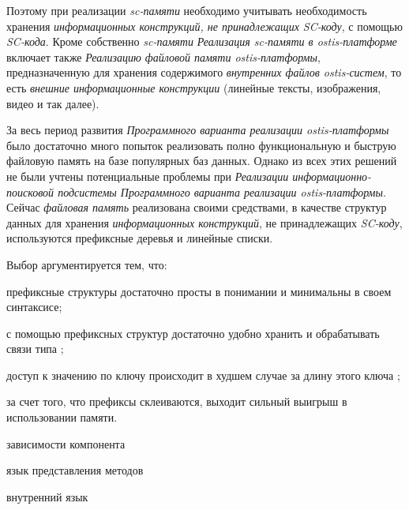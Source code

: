 Поэтому при реализации \textit{sc-памяти} необходимо учитывать необходимость хранения \textit{информационных конструкций, не принадлежащих SC-коду}, с помощью \textit{SC-кода}. Кроме собственно \textit{sc-памяти} \textit{Реализация sc-памяти в ostis-платформе} включает также \textit{Реализацию файловой памяти ostis-платформы}, предназначенную для хранения содержимого \textit{внутренних файлов ostis-систем}, то есть \textit{внешние информационные конструкции} (линейные тексты, изображения, видео и так далее).

За весь период развития \textit{Программного варианта реализации ostis-платформы} было достаточно много попыток реализовать полно функциональную и быструю файловую память на базе популярных баз данных. Однако из всех этих решений не были учтены потенциальные проблемы при \textit{Реализации информационно-поисковой подсистемы Программного варианта реализации ostis-платформы}. Сейчас \textit{файловая память} реализована своими средствами, в качестве структур данных для хранения \textit{информационных конструкций}, не принадлежащих \textit{SC-коду}, используются префиксные деревья  и линейные списки.

Выбор аргументируется тем, что:
\begin{textitemize}
    \item префиксные структуры достаточно просты в понимании и минимальны в своем синтаксисе;
    \item с помощью префиксных структур достаточно удобно хранить и обрабатывать связи типа ;
    \item доступ к значению по ключу происходит в худшем случае за длину этого ключа ;
    \item за счет того, что префиксы склеиваются, выходит сильный выигрыш в использовании памяти.
\end{textitemize}

\begin{SCn}
\begin{scnrelfromset}{зависимости компонента}
\end{scnrelfromset}
\begin{scnrelfromlist}{язык представления методов}
\end{scnrelfromlist}
\begin{scnrelfromlist}{внутренний язык}
\end{scnrelfromlist}
\end{SCn}

